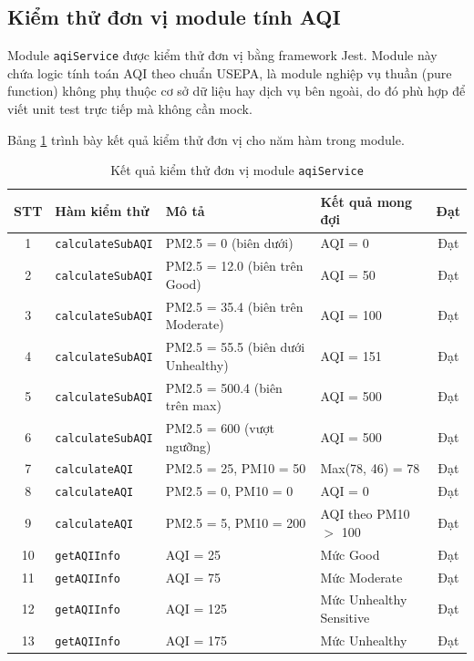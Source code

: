 \documentclass[../DoAn.tex]{subfiles}
\begin{document}
\subsection{Kiểm thử đơn vị module tính AQI}
\label{subsection:4.4.7}

Module \texttt{aqiService} được kiểm thử đơn vị bằng framework Jest. Module này chứa logic tính toán AQI theo chuẩn \gls{USEPA}, là module nghiệp vụ thuần (pure function) không phụ thuộc cơ sở dữ liệu hay dịch vụ bên ngoài, do đó phù hợp để viết unit test trực tiếp mà không cần mock.

Bảng \ref{table:test_aqi_unit} trình bày kết quả kiểm thử đơn vị cho năm hàm trong module.

\begin{table}[H]
\centering
\caption{Kết quả kiểm thử đơn vị module \texttt{aqiService}}
\label{table:test_aqi_unit}
\small
\begin{tabularx}{\textwidth}{|c|X|X|X|c|}
\hline
\textbf{STT} & \textbf{Hàm kiểm thử} & \textbf{Mô tả} & \textbf{Kết quả mong đợi} & \textbf{Đạt} \\
\hline
1 & \texttt{calculateSubAQI} & PM2.5 = 0 (biên dưới) & AQI = 0 & Đạt \\
\hline
2 & \texttt{calculateSubAQI} & PM2.5 = 12.0 (biên trên Good) & AQI = 50 & Đạt \\
\hline
3 & \texttt{calculateSubAQI} & PM2.5 = 35.4 (biên trên Moderate) & AQI = 100 & Đạt \\
\hline
4 & \texttt{calculateSubAQI} & PM2.5 = 55.5 (biên dưới Unhealthy) & AQI = 151 & Đạt \\
\hline
5 & \texttt{calculateSubAQI} & PM2.5 = 500.4 (biên trên max) & AQI = 500 & Đạt \\
\hline
6 & \texttt{calculateSubAQI} & PM2.5 = 600 (vượt ngưỡng) & AQI = 500 & Đạt \\
\hline
7 & \texttt{calculateAQI} & PM2.5 = 25, PM10 = 50 & Max(78, 46) = 78 & Đạt \\
\hline
8 & \texttt{calculateAQI} & PM2.5 = 0, PM10 = 0 & AQI = 0 & Đạt \\
\hline
9 & \texttt{calculateAQI} & PM2.5 = 5, PM10 = 200 & AQI theo PM10 $>$ 100 & Đạt \\
\hline
10 & \texttt{getAQIInfo} & AQI = 25 & Mức Good & Đạt \\
\hline
11 & \texttt{getAQIInfo} & AQI = 75 & Mức Moderate & Đạt \\
\hline
12 & \texttt{getAQIInfo} & AQI = 125 & Mức Unhealthy Sensitive & Đạt \\
\hline
13 & \texttt{getAQIInfo} & AQI = 175 & Mức Unhealthy & Đạt \\

\end{tabularx}
\end{table}
\end{document}
